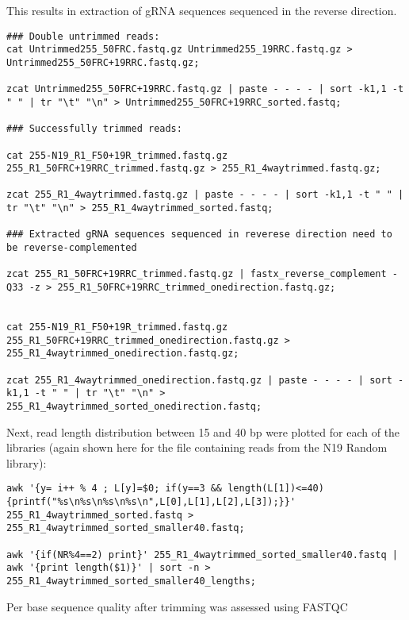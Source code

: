 This results in extraction of gRNA sequences sequenced in the reverse direction.

\begin{small}\begin{lstlisting}
### Double untrimmed reads:
cat Untrimmed255_50FRC.fastq.gz Untrimmed255_19RRC.fastq.gz > Untrimmed255_50FRC+19RRC.fastq.gz;

zcat Untrimmed255_50FRC+19RRC.fastq.gz | paste - - - - | sort -k1,1 -t " " | tr "\t" "\n" > Untrimmed255_50FRC+19RRC_sorted.fastq;

### Successfully trimmed reads:

cat 255-N19_R1_F50+19R_trimmed.fastq.gz 255_R1_50FRC+19RRC_trimmed.fastq.gz > 255_R1_4waytrimmed.fastq.gz;

zcat 255_R1_4waytrimmed.fastq.gz | paste - - - - | sort -k1,1 -t " " | tr "\t" "\n" > 255_R1_4waytrimmed_sorted.fastq;

### Extracted gRNA sequences sequenced in reverese direction need to be reverse-complemented

zcat 255_R1_50FRC+19RRC_trimmed.fastq.gz | fastx_reverse_complement -Q33 -z > 255_R1_50FRC+19RRC_trimmed_onedirection.fastq.gz;


cat 255-N19_R1_F50+19R_trimmed.fastq.gz 255_R1_50FRC+19RRC_trimmed_onedirection.fastq.gz > 255_R1_4waytrimmed_onedirection.fastq.gz;

zcat 255_R1_4waytrimmed_onedirection.fastq.gz | paste - - - - | sort -k1,1 -t " " | tr "\t" "\n" > 255_R1_4waytrimmed_sorted_onedirection.fastq;
\end{lstlisting}\end{small}


Next, read length distribution between 15 and 40 bp were plotted for each of the libraries (again shown here for the file containing reads from the N19 Random library):

\begin{small}\begin{lstlisting}
awk '{y= i++ % 4 ; L[y]=$0; if(y==3 && length(L[1])<=40) {printf("%s\n%s\n%s\n%s\n",L[0],L[1],L[2],L[3]);}}' 255_R1_4waytrimmed_sorted.fastq > 255_R1_4waytrimmed_sorted_smaller40.fastq;

awk '{if(NR%4==2) print}' 255_R1_4waytrimmed_sorted_smaller40.fastq | awk '{print length($1)}' | sort -n >  255_R1_4waytrimmed_sorted_smaller40_lengths;
\end{lstlisting}\end{small}


Per base sequence quality after trimming was assessed using FASTQC \cite{FASTQC:Online}

